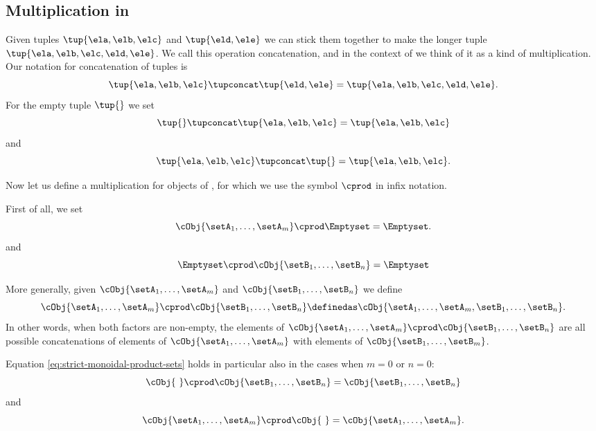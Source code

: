 \subsection{Multiplication in \cCat{\Set}}

Given tuples $\tup{\ela, \elb, \elc}$ and $\tup{\eld, \ele}$ we can stick them together to make the longer tuple $\tup{\ela, \elb, \elc, \eld, \ele}$.
We call this operation concatenation, and in the context of \cCat{\Set} we think of it as a kind of multiplication.
Our notation for concatenation of tuples is
\begin{equation}
    \tup{\ela, \elb, \elc} \tupconcat \tup{\eld, \ele} = \tup{\ela, \elb, \elc, \eld, \ele}.
\end{equation}
For the empty tuple $\tup{  }$ we set
\begin{equation}
    \tup{} \tupconcat \tup{\ela, \elb, \elc}  = \tup{\ela, \elb, \elc}
\end{equation}
and
\begin{equation}
    \tup{\ela, \elb, \elc}  \tupconcat \tup{ } = \tup{\ela, \elb, \elc}.
\end{equation}

Now let us define a multiplication for objects of \cCat{\Set}, for which we use the symbol $\cprod$ in infix notation. 

First of all, we set 
\begin{equation}
    \cObj{\setA_1, \dots, \setA_m} \cprod \Emptyset = \Emptyset.
\end{equation}
and
\begin{equation}
    \Emptyset \cprod \cObj{\setB_1, \dots, \setB_n} = \Emptyset
\end{equation}

More generally, given $\cObj{\setA_1, \dots, \setA_m}$ and $\cObj{\setB_1,  \dots, \setB_n}$ we define
\begin{equation}
\label{eq:strict-monoidal-product-sets}
   \cObj{\setA_1, \dots, \setA_m} \cprod \cObj{\setB_1, \dots, \setB_n} \definedas \cObj{\setA_1, \dots, \setA_m, \setB_1,  \dots, \setB_n}.
\end{equation}
In other words, when both factors are non-empty, the elements of $\cObj{\setA_1, \dots, \setA_m} \cprod \cObj{\setB_1, \dots, \setB_n}$ are all possible concatenations of elements of $\cObj{\setA_1, \dots, \setA_m}$ with elements of $\cObj{\setB_1, \dots, \setB_m}$.

Equation \cref{eq:strict-monoidal-product-sets} holds in particular also in the cases when $m = 0$ or $n =0$:
\begin{equation}
    \cObj{ \ } \cprod \cObj{\setB_1, \dots, \setB_n} = \cObj{\setB_1,  \dots, \setB_n}
\end{equation}
and
\begin{equation}
    \cObj{\setA_1, \dots, \setA_m} \cprod \cObj{ \ } = \cObj{\setA_1, \dots, \setA_m}.
\end{equation}


